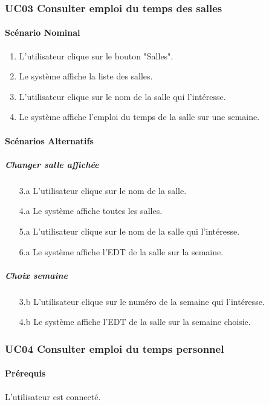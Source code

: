\documentclass[a4paper,12pt]{article}
\begin{document}
\subsubsection{UC03 Consulter emploi du temps des salles}
\paragraph{Scénario Nominal}
\begin{enumerate}
    \item L'utilisateur clique sur le bouton "Salles".
    \item Le système affiche la liste des salles.
    \item L'utilisateur clique sur le nom de la salle qui l'intéresse.
    \item Le système affiche l'emploi du temps de la salle sur une semaine.
\end{enumerate}

\paragraph{Scénarios Alternatifs}
\subparagraph{Changer salle affichée}
\begin{enumerate}
    \item[3.a] L'utilisateur clique sur le nom de la salle.
    \item[4.a] Le système affiche toutes les salles.
    \item[5.a] L'utilisateur clique sur le nom de la salle qui l'intéresse.
    \item[6.a] Le système affiche l'EDT de la salle sur la semaine.
\end{enumerate}

\subparagraph{Choix semaine}
\begin{enumerate}
    \item[3.b] L'utilisateur clique sur le numéro de la semaine qui l'intéresse.
    \item[4.b] Le système affiche l'EDT de la salle sur la semaine choisie.
\end{enumerate}

\subsubsection{UC04 Consulter emploi du temps personnel}
\paragraph{Prérequis} L'utilisateur est connecté.
\end{document}
